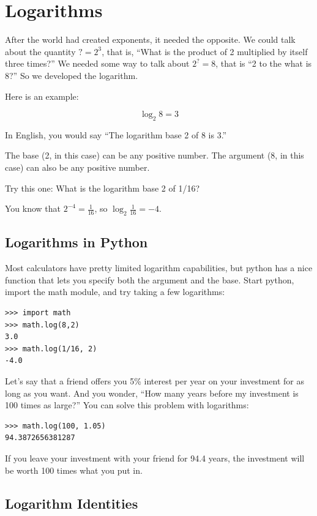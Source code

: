 \chapter{Logarithms}

After the world had created exponents, it needed the opposite. We
could talk about the quantity $? = 2^3$, that is, ``What is the
product of 2 multiplied by itself three times?''  We needed some way
to talk about $2^? = 8$, that is ``2 to the what is 8?'' So we
developed the logarithm. 

Here is an example:

$$\log_{2}8 = 3$$

In English, you would say ``The logarithm base 2 of 8 is 3.''

The base (2, in this case) can be any positive number. The argument
(8, in this case) can also be any positive number.

Try this one: What is the logarithm base 2 of 1/16?

You know that $2^{-4} = \frac{1}{16}$, so $\log_{2} \frac{1}{16} = -4$.

\section{Logarithms in Python}

Most calculators have pretty limited logarithm capabilities, but
python has a nice  function that lets you specify both
the argument and the base. Start python, import the math module, and try taking a few logarithms:

\begin{Verbatim}
>>> import math
>>> math.log(8,2)
3.0
>>> math.log(1/16, 2)
-4.0
\end{Verbatim}

Let's say that a friend offers you 5\% interest per year on your
investment for as long as you want. And you wonder, ``How many years
before my investment is 100 times as large?'' You can solve this problem with logarithms:

\begin{Verbatim}
>>> math.log(100, 1.05)
94.3872656381287
\end{Verbatim}

If you leave your investment with your friend for 94.4 years, the
investment will be worth 100 times what you put in.

\section{Logarithm Identities}

